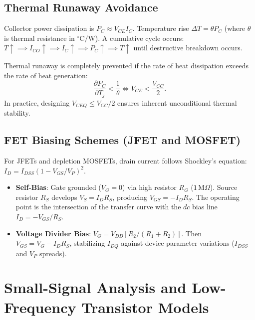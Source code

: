 \documentclass[12pt,a4paper]{article}
\begin{document}
\subsection{Thermal Runaway Avoidance}
Collector power dissipation is $P_C \approx V_{CE} I_C$. Temperature rise $\Delta T = \theta P_C$ (where $\theta$ is thermal resistance in $^\circ\mathrm{C/W}$). A cumulative cycle occurs: $T \uparrow \implies I_{CO} \uparrow \implies I_C \uparrow \implies P_C \uparrow \implies T \uparrow$ until destructive breakdown occurs.
\begin{tcolorbox}[formulabox, title={Condition to Prevent Thermal Runaway}]
Thermal runaway is completely prevented if the rate of heat dissipation exceeds the rate of heat generation:
\[
\frac{\partial P_C}{\partial T_j} < \frac{1}{\theta} \iff V_{CE} < \frac{V_{CC}}{2}.
\]
In practice, designing $V_{CEQ} \le V_{CC}/2$ ensures inherent unconditional thermal stability.
\end{tcolorbox}

\subsection{FET Biasing Schemes (JFET and MOSFET)}
For JFETs and depletion MOSFETs, drain current follows Shockley's equation: $I_D = I_{DSS}(1 - V_{GS}/V_P)^2$.
\begin{itemize}[leftmargin=1.5em, itemsep=2pt]
  \item \textbf{Self-Bias}: Gate grounded ($V_G = 0$) via high resistor $R_G$ ($1\,\mathrm{M}\Omega$). Source resistor $R_S$ develops $V_S = I_D R_S$, producing $V_{GS} = -I_D R_S$. The operating point is the intersection of the transfer curve with the $dc$ bias line $I_D = -V_{GS}/R_S$.
  \item \textbf{Voltage Divider Bias}: $V_G = V_{DD}[R_2/(R_1+R_2)]$. Then $V_{GS} = V_G - I_D R_S$, stabilizing $I_{DQ}$ against device parameter variations ($I_{DSS}$ and $V_P$ spreads).
\end{itemize}

\section{Small-Signal Analysis and Low-Frequency Transistor Models}
\end{document}
